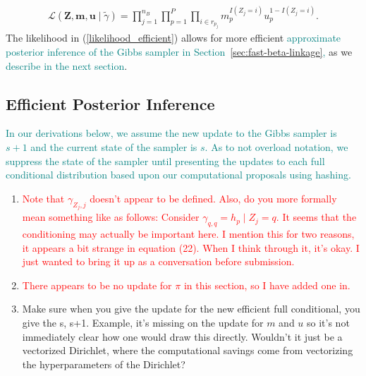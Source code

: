 \documentclass[ba]{imsart}
\begin{document}
\begin{align}\label{likelihood_efficient}
	\mathcal{L}(\bm{Z}, \bm{m}, \bm{u} \mid \tilde{\gamma}) = \prod_{j=1}^{n_B}\prod_{p=1}^P \prod_{i \in r_{p_j}} m_p^{I(Z_j = i)}u_p^{1 - I(Z_j = i)}. 
\end{align}
The likelihood in (\ref{likelihood_efficient}) allows for more
efficient \textcolor{teal}{approximate posterior inference of the Gibbs sampler in Section~\ref{sec:fast-beta-linkage},}  as we \textcolor{teal}{describe in the next section}.


\hypertarget{efficient-posterior}{%
	\subsection{Efficient Posterior Inference }\label{efficient-posterior}}

\textcolor{teal}{In our derivations below, we assume the new update to the Gibbs sampler is $s+1$ and the current state of the sampler is $s.$ As to not overload notation, we suppress the state of the sampler until presenting the updates to each full conditional distribution based upon our computational proposals using hashing.} 

\begin{enumerate}	
\item \textcolor{red}{Note that 	$\gamma_{Z_j, j}$ doesn't appear to be defined. Also, do you more formally mean something like as follows: Consider $\gamma_{q,q} = h_p \mid Z_j = q$. It seems that the conditioning may actually be important here. I mention this for two reasons, it appears a bit strange in equation (22). When I think through it, it's okay. I just wanted to bring it up as a conversation before submission.}
\item \textcolor{red}{There appears to be no update for $\pi$ in this section, so I have added one in.}
\item Make sure when you give the update for the new efficient full conditional, you give the s, s+1. Example, it's missing on the update for $m$ and $u$ so it's not immediately clear how one would draw this directly. Wouldn't it just be a vectorized Dirichlet, where the computational savings come from vectorizing the hyperparameters of the Dirichlet?
\end{enumerate}
\end{document}
